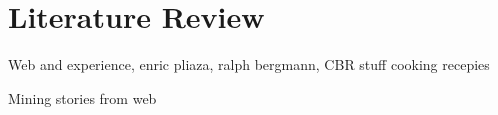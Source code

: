 
\chapter{Literature Review}

Web and experience, enric pliaza, ralph bergmann, CBR stuff cooking recepies

Mining stories from web

\cleardoublepage
